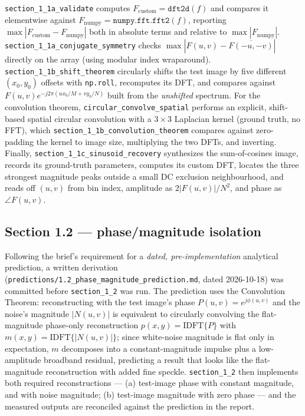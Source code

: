 \documentclass[11pt]{article}
\begin{document}
\texttt{section\_1\_1a\_validate} computes $F_\text{custom}=\texttt{dft2d}(f)$ and compares it
elementwise against $F_\text{numpy}=\texttt{numpy.fft.fft2}(f)$, reporting
$\max|F_\text{custom}-F_\text{numpy}|$ both in absolute terms and relative to
$\max|F_\text{numpy}|$. \texttt{section\_1\_1a\_conjugate\_symmetry} checks
$\max|F(u,v)-\overline{F(-u,-v)}|$ directly on the array (using modular index wraparound).
\texttt{section\_1\_1b\_shift\_theorem} circularly shifts the test image by five different
$(x_0,y_0)$ offsets with \texttt{np.roll}, recomputes its DFT, and compares against
$F(u,v)e^{-j2\pi(ux_0/M+vy_0/N)}$ built from the \emph{unshifted} spectrum. For the convolution
theorem, \texttt{circular\_convolve\_spatial} performs an explicit, shift-based spatial circular
convolution with a $3\times3$ Laplacian kernel (ground truth, no FFT), which
\texttt{section\_1\_1b\_convolution\_theorem} compares against zero-padding the kernel to image
size, multiplying the two DFTs, and inverting. Finally, \texttt{section\_1\_1c\_sinusoid\_recovery}
synthesizes the sum-of-cosines image, records its ground-truth parameters, computes its custom
DFT, locates the three strongest magnitude peaks outside a small DC exclusion neighbourhood, and
reads off $(u,v)$ from bin index, amplitude as $2|F(u,v)|/N^2$, and phase as $\angle F(u,v)$.

\subsection{Section 1.2 — phase/magnitude isolation}

Following the brief's requirement for a \emph{dated, pre-implementation} analytical prediction,
a written derivation (\texttt{predictions/1.2\_phase\_magnitude\_prediction.md}, dated
2026-10-18) was committed before \texttt{section\_1\_2} was run. The prediction uses the
Convolution Theorem: reconstructing with the test image's phase $P(u,v)=e^{j\phi(u,v)}$ and the
noise's magnitude $|N(u,v)|$ is equivalent to circularly convolving the flat-magnitude
phase-only reconstruction $p(x,y)=\text{IDFT}\{P\}$ with $m(x,y)=\text{IDFT}\{|N(u,v)|\}$; since
white-noise magnitude is flat only in expectation, $m$ decomposes into a constant-magnitude
impulse plus a low-amplitude broadband residual, predicting a result that looks like the
flat-magnitude reconstruction with added fine speckle. \texttt{section\_1\_2} then implements
both required reconstructions — (a) test-image phase with constant magnitude, and with noise
magnitude; (b) test-image magnitude with zero phase — and the measured outputs are reconciled
against the prediction in the report.
\end{document}
